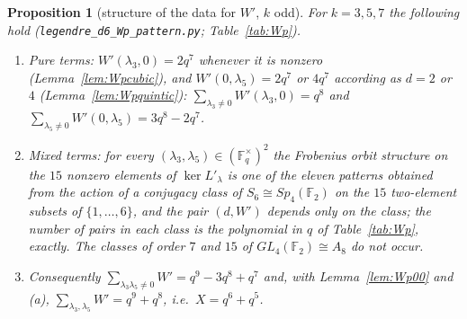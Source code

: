 \documentclass[11pt,a4paper]{amsart}
\newtheorem{proposition}[theorem]{Proposition}
\theoremstyle{definition}
\newcommand{\F}{\mathbb{F}}
\begin{document}
\begin{proposition}[structure of the data for $W'$, $k$ odd]\label{prop:Wpdata}
For $k=3,5,7$ the following hold (\texttt{legendre\_d6\_Wp\_pattern.py}; Table~\ref{tab:Wp}).
\begin{enumerate}[label=\textup{(\alph*)},leftmargin=2em]
\item Pure terms: $W'(\lambda_3,0)=2q^7$ whenever it is nonzero (Lemma~\ref{lem:Wpcubic}), and $W'(0,\lambda_5)=2q^7$ or $4q^7$ according as $d=2$ or $4$ (Lemma~\ref{lem:Wpquintic}): $\sum_{\lambda_3\ne0}W'(\lambda_3,0)=q^8$ and $\sum_{\lambda_5\ne0}W'(0,\lambda_5)=3q^8-2q^7$.
\item Mixed terms: for every $(\lambda_3,\lambda_5)\in(\F_q^\times)^2$ the Frobenius orbit structure on the $15$ nonzero elements of $\ker L'_\lambda$ is one of the eleven patterns obtained from the action of a conjugacy class of $S_6\cong Sp_4(\F_2)$ on the $15$ two-element subsets of $\{1,\dots,6\}$, and the pair $(d,W')$ depends only on the class; the number of pairs in each class is the polynomial in $q$ of Table~\ref{tab:Wp}, exactly. The classes of order $7$ and $15$ of $GL_4(\F_2)\cong A_8$ do not occur.
\item Consequently $\sum_{\lambda_3\lambda_5\ne0}W'=q^9-3q^8+q^7$ and, with Lemma~\ref{lem:Wp00} and (a), $\sum_{\lambda_3,\lambda_5}W'=q^9+q^8$, i.e.\ $X=q^6+q^5$.
\end{enumerate}
\end{proposition}
\end{document}
